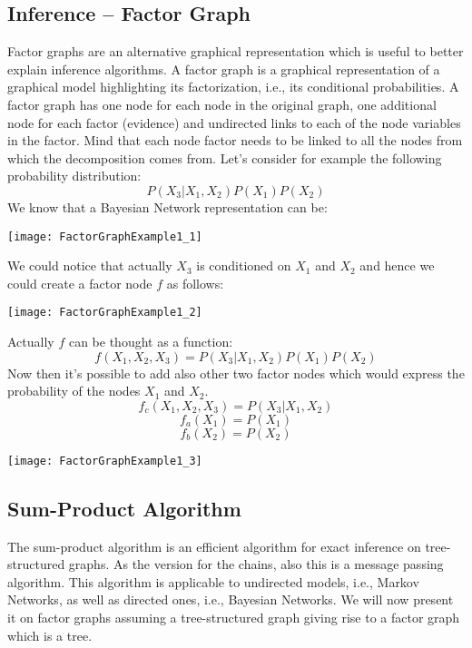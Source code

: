 \subsection{Inference -- Factor Graph}
Factor graphs are an alternative graphical representation which is useful to better explain inference algorithms. \newline
A factor graph is a graphical representation of a graphical model highlighting its factorization, i.e., its conditional probabilities. A factor graph has one node for each node in the original graph, one additional node for each factor (evidence) and undirected links to each of the node variables in the factor. \newline
Mind that each node factor needs to be linked to all the nodes from which the decomposition comes from. \newline
Let's consider for example the following probability distribution:
\[P(X_3\vert X_1,X_2)P(X_1)P(X_2)\]
We know that a Bayesian Network representation can be:
\begin{center}
  \texttt{[image: FactorGraphExample1\_1]}
\end{center}
We could notice that actually $X_3$ is conditioned on $X_1$ and $X_2$ and hence we could create a factor node $f$ as follows:
\begin{center}
  \texttt{[image: FactorGraphExample1\_2]}
\end{center}
Actually $f$ can be thought as a function:
\[f(X_1,X_2,X_3)=P(X_3\vert X_1,X_2)P(X_1)P(X_2)\]
Now then it's possible to add also other two factor nodes which would express the probability of the nodes $X_1$ and $X_2$. 
\[f_c(X_1,X_2,X_3)=P(X_3\vert X_1,X_2)\]
\[f_a(X_1)=P(X_1)\]
\[f_b(X_2)=P(X_2)\]
\begin{center}
  \texttt{[image: FactorGraphExample1\_3]}
\end{center}
%
%
\subsection{Sum-Product Algorithm}
The sum-product algorithm is an efficient algorithm for exact inference on tree-structured graphs. As the version for the chains, also this is a message passing algorithm. \newline
This algorithm is applicable to undirected models, i.e., Markov Networks, as well as directed ones, i.e., Bayesian Networks. 
We will now present it on factor graphs assuming a tree-structured graph giving rise to a factor graph which is a tree. \newline
%
